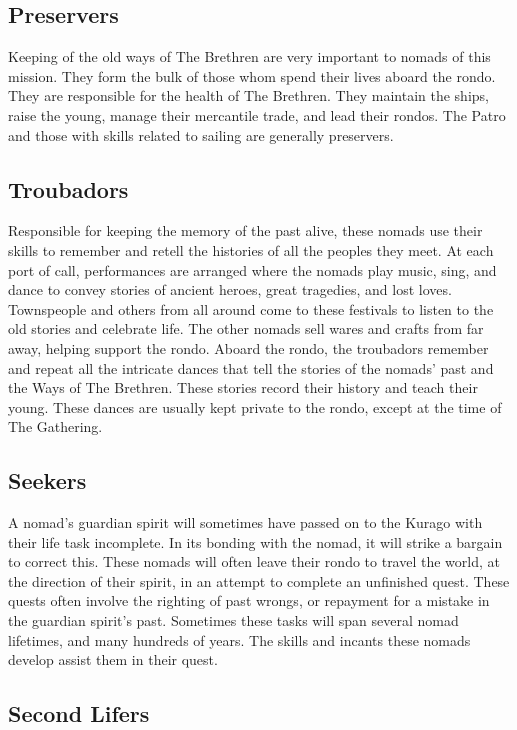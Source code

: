 \begin{multicols*}{2}
\subsection{Preservers}

Keeping of the old ways of The Brethren are very important to nomads of this mission. They form the bulk of those whom spend their lives aboard the rondo. They are responsible for the health of The Brethren. They maintain the ships, raise the young, manage their mercantile trade, and lead their rondos. The Patro and those with skills related to sailing are generally preservers.

\subsection{Troubadors}

Responsible for keeping the memory of the past alive, these nomads use their skills to remember and retell the histories of all the peoples they meet. At each port of call, performances are arranged where the nomads play music, sing, and dance to convey stories of ancient heroes, great tragedies, and lost loves. Townspeople and others from all around come to these festivals to listen to the old stories and celebrate life. The other nomads sell wares and crafts from far away, helping support the rondo. Aboard the rondo, the troubadors remember and repeat all the intricate dances that tell the stories of the nomads' past and the Ways of The Brethren. These stories record their history and teach their young. These dances are usually kept private to the rondo, except at the time of The Gathering.

\subsection{Seekers}

A nomad's guardian spirit will sometimes have passed on to the Kurago with their life task incomplete. In its bonding with the nomad, it will strike a bargain to correct this. These nomads will often leave their rondo to travel the world, at the direction of their spirit, in an attempt to complete an unfinished quest. These quests often involve the righting of past wrongs, or repayment for a mistake in the guardian spirit's past. Sometimes these tasks will span several nomad lifetimes, and many hundreds of years. The skills and incants these nomads develop assist them in their quest.

\subsection{Second Lifers}


\end{multicols*}
